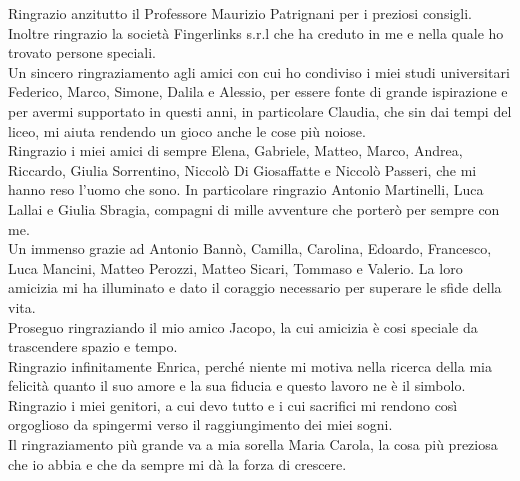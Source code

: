 Ringrazio anzitutto il Professore Maurizio Patrignani per i preziosi consigli.
Inoltre ringrazio la società Fingerlinks s.r.l che ha creduto in me e nella quale ho trovato persone speciali.\\
Un sincero ringraziamento agli amici con cui ho condiviso i miei studi universitari \\
Federico, Marco, Simone, Dalila e Alessio, per essere fonte di grande ispirazione e per avermi supportato in questi anni, in particolare Claudia, che sin dai tempi del liceo, mi aiuta rendendo un gioco anche le cose più noiose.\\
Ringrazio i miei amici di sempre Elena, Gabriele, Matteo, Marco, Andrea, Riccardo, Giulia Sorrentino, Niccolò Di Giosaffatte e Niccolò Passeri, che mi hanno reso l'uomo che sono. In particolare ringrazio Antonio Martinelli, Luca Lallai e Giulia Sbragia, compagni di mille avventure che porterò per sempre con me.\\  
Un immenso grazie ad Antonio Bannò, Camilla, Carolina, Edoardo, Francesco, Luca Mancini, Matteo Perozzi, Matteo Sicari, Tommaso e Valerio. La loro amicizia mi ha illuminato e dato il coraggio necessario per superare le sfide della vita.\\
Proseguo ringraziando il mio amico Jacopo, la cui amicizia è cosi speciale da trascendere spazio e tempo. \\
Ringrazio infinitamente Enrica, perché niente mi motiva nella ricerca della mia felicità quanto il suo amore e la sua fiducia e questo lavoro ne è il simbolo.\\
Ringrazio i miei genitori, a cui devo tutto e i cui sacrifici mi rendono così orgoglioso da spingermi verso il raggiungimento dei miei sogni.\\

Il ringraziamento più grande va a mia sorella Maria Carola, la cosa più preziosa che io abbia e che da sempre mi dà la forza di crescere.
